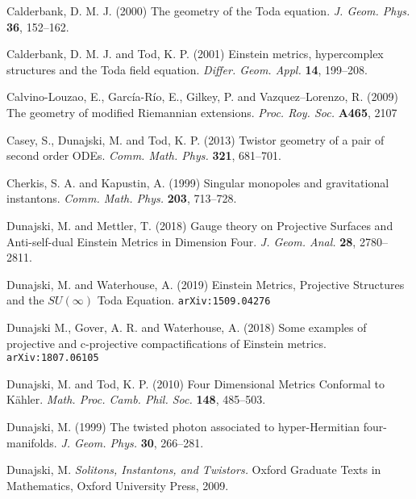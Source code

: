 \begin{thebibliography}{}
 Calderbank, D. M. J. (2000) The geometry of the Toda 
equation. \textit{J. Geom. Phys.} {\bf 36},  152--162.


 Calderbank, D. M. J. and Tod,  K. P. (2001)
Einstein metrics, hypercomplex structures and the Toda field equation.
\textit{Differ. Geom. Appl.} {\bf 14},  199--208.


 Calvino-Louzao, E., Garc\' ia-R\' io, E., Gilkey, P. and Vazquez--Lorenzo, R. (2009) The geometry of modified Riemannian extensions. \textit{Proc. Roy. Soc.} {\bf A465}, 2107



 Casey, S., Dunajski, M. and Tod, K. P. (2013)
Twistor geometry of a pair of second order ODEs. 
\textit{Comm. Math. Phys.} { \bf 321}, 681--701.



 Cherkis, S. A.  and Kapustin, A. (1999) Singular monopoles and gravitational
instantons. \textit{Comm. Math. Phys.} {\bf 203}, 713--728.



 Dunajski, M. and Mettler, T. (2018) Gauge theory on Projective Surfaces and Anti-self-dual Einstein Metrics in Dimension Four.  
\textit{J. Geom. Anal.} {\bf 28}, 2780--2811.
 
 Dunajski, M. and Waterhouse, A. (2019)
Einstein Metrics, Projective Structures and the $SU(\infty)$ Toda Equation.
{\tt{arXiv:1509.04276}}
 

 Dunajski M., Gover, A. R. and Waterhouse, A. (2018) Some examples of projective and c-projective compactifications of Einstein metrics.  {\tt arXiv:1807.06105}

 Dunajski, M. and Tod, K. P. (2010) Four Dimensional Metrics Conformal to K\"ahler. \textit{Math. Proc. Camb. Phil. Soc.} {\bf 148}, 485--503.

 Dunajski, M. (1999) The twisted photon associated to hyper-Hermitian four-manifolds. \textit{J. Geom. Phys.} {\bf 30}, 266--281.

 Dunajski, M. \textit{Solitons, Instantons, and Twistors.} Oxford Graduate Texts in Mathematics, Oxford University Press, 2009.


\end{thebibliography}
